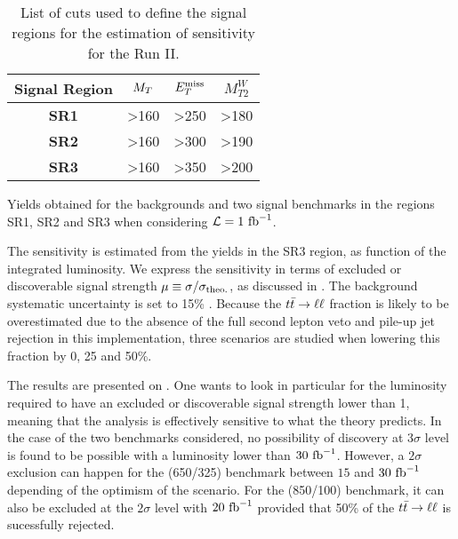        \begin{table}
            \centering
            \begin{tabular}{|c|ccc|}
                \hline
                \textbf{Signal Region} & $M_T$ & $E_T^\text{miss}$ & $M_{T2}^W$ \\
                \hline
                \textbf{SR1}           & >160  & >250 & >180 \\
                \textbf{SR2}           & >160  & >300 & >190 \\
                \textbf{SR3}           & >160  & >350 & >200 \\
                \hline
            \end{tabular}
            \caption{List of cuts used to define the signal regions for the estimation of
            sensitivity for the Run II. \label{tab:phys14Cuts}}
        \end{table}

        \begin{table}
            \centering
            
            \caption{Yields obtained for the backgrounds and two signal benchmarks in
                     the regions SR1, SR2 and SR3 when considering
                     $\mathcal{L} = 1~\text{fb}^{-1}$. \label{tab:phys14SignalRegions}}
        \end{table}

       The sensitivity is estimated from the yields in the SR3 region, as function
       of the integrated luminosity. We express the sensitivity in terms of excluded or
       discoverable signal strength $\mu \equiv \sigma / \sigma_\text{theo.}$, as
       discussed in . The background systematic uncertainty
       is set to 15\% . Because the $t\bar{t} \rightarrow \ell \ell$ fraction is likely to be overestimated
       due to the absence of the full second lepton veto and pile-up jet rejection in
       this implementation, three scenarios are studied when lowering this fraction by 0,
       25 and 50\%.

       The results are presented on .
       One wants to look in particular for the luminosity required to have an excluded or
       discoverable signal strength lower than 1, meaning that the analysis is effectively
       sensitive to what the theory predicts. In the case of the two benchmarks considered,
       no possibility of discovery at 3$\sigma$ level is found to be possible with
       a luminosity lower than $30~\text{fb}^{-1}$. However, a $2\sigma$ exclusion can happen for
       the (650/325) benchmark between $15$ and $30~\text{fb}^{-1}$ depending of the optimism of the
       scenario. For the (850/100) benchmark, it can also be excluded at the $2\sigma$ level
       with $20~\text{fb}^{-1}$ provided that 50\% of the $t\bar{t} \rightarrow \ell \ell$ is sucessfully rejected.

